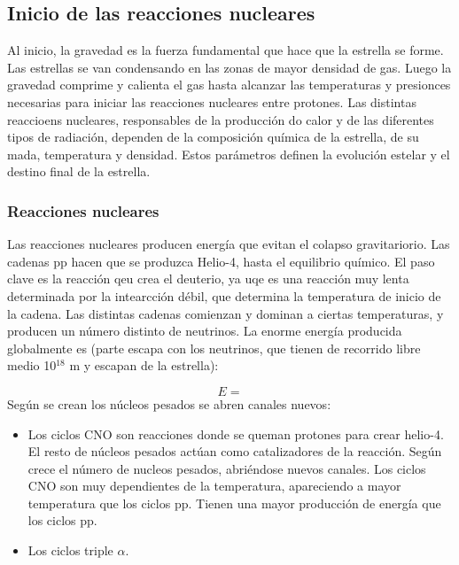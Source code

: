 \subsection{Inicio de las reacciones nucleares}

Al inicio, la gravedad es la fuerza fundamental que hace que la estrella se forme. Las estrellas se van condensando en las zonas de mayor densidad de gas. Luego la gravedad comprime y calienta el gas hasta alcanzar las temperaturas y presionces necesarias para iniciar las reacciones nucleares entre protones. Las distintas reaccioens nucleares, responsables de la producción do calor y de las diferentes tipos de radiación, dependen de la composición química de la estrella, de su mada, temperatura y densidad. Estos parámetros definen la evolución estelar y el destino final de la estrella. 

\subsubsection{Reacciones nucleares}

Las reacciones nucleares producen energía que evitan el colapso gravitariorio. Las cadenas pp hacen que se produzca Helio-4, hasta el equilibrio químico. El paso clave es la reacción qeu crea el deuterio, ya uqe es una reacción muy lenta determinada por la intearcción débil, que determina la temperatura de inicio de la cadena. Las distintas cadenas comienzan y dominan a ciertas temperaturas, y producen un número distinto de neutrinos. La enorme energía producida globalmente es (parte escapa con los neutrinos, que tienen de recorrido libre medio 10$^{18}$ m y escapan de la estrella):

\begin{equation}
    E = 
\end{equation}
Según se crean los núcleos pesados se abren canales nuevos:

\begin{itemize}
    \item Los ciclos CNO son reacciones donde se queman protones para crear helio-4. El resto de núcleos pesados actúan como catalizadores de la reacción. Según crece el número de nucleos pesados, abriéndose nuevos canales. Los ciclos CNO son muy dependientes de la temperatura, apareciendo a mayor temperatura que los ciclos pp. Tienen una mayor producción de energía que los ciclos pp. 
    \item Los ciclos triple $\alpha$.
\end{itemize}

